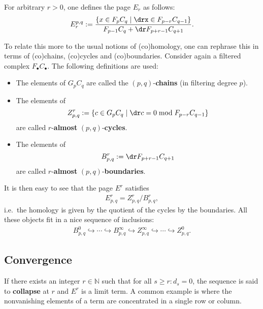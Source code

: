 	For arbitrary $r>0$, one defines the page $E_r$ as follows:
	\begin{gather}
    	E_r^{p,q}:=\frac{\{x\in F_pC_q\mid\drx\in F_{p-r}C_{q-1}\}}{F_{p-1}C_q+\dr F_{p+r-1}C_{q+1}}.
	\end{gather}

    To relate this more to the usual notions of (co)homology, one can rephrase this in terms of (co)chains, (co)cycles and (co)boundaries. Consider again a filtered complex $F_\bullet C_\bullet$. The following definitions are used:
    \begin{itemize}
        \item The elements of $G_pC_q$ are called the $(p,q)$-\textbf{chains} (in filtering degree $p$).
        \item The elements of \[Z^r_{p,q} := \{c\in G_pC_q\mid\dr c=0\bmod F_{p-r}C_{q-1}\}\] are called $r$-\textbf{almost} $(p,q)$-\textbf{cycles}.
        \item The elements of \[B^r_{p,q} := \dr F_{p+r-1}C_{q+1}\] are called $r$-\textbf{almost} $(p,q)$-\textbf{boundaries}.
    \end{itemize}
    It is then easy to see that the page $E^r$ satisfies
    \begin{gather}
        E^r_{p,q} = Z^r_{p,q}/B^r_{p,q},
    \end{gather}
    i.e.~the homology is given by the quotient of the cycles by the boundaries. All these objects fit in a nice sequence of inclusions:
    \begin{gather}
        B^0_{p,q}\hookrightarrow\cdots\hookrightarrow B^\infty_{p,q}\hookrightarrow Z^\infty_{p,q}\hookrightarrow\cdots\hookrightarrow Z^0_{p,q}.
    \end{gather}

\subsection{Convergence}

    \begin{example}
        If there exists an integer $r\in\mathbb{N}$ such that for all $s\geq r:d_s=0$, the sequence is said to \textbf{collapse} at $r$ and $E^r$ is a limit term. A common example is where the nonvanishing elements of a term are concentrated in a single row or column.
    \end{example}

